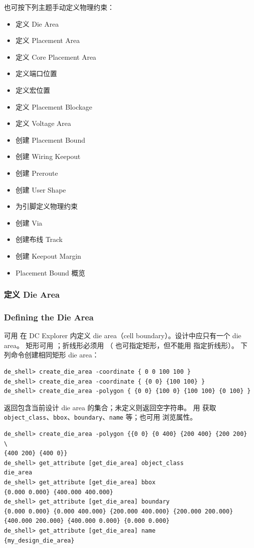 也可按下列主题手动定义物理约束：
\begin{itemize}
  \item 定义 Die Area
  \item 定义 Placement Area
  \item 定义 Core Placement Area
  \item 定义端口位置
  \item 定义宏位置
  \item 定义 Placement Blockage
  \item 定义 Voltage Area
  \item 创建 Placement Bound
  \item 创建 Wiring Keepout
  \item 创建 Preroute
  \item 创建 User Shape
  \item 为引脚定义物理约束
  \item 创建 Via
  \item 创建布线 Track
  \item 创建 Keepout Margin
  \item Placement Bound 概览
\end{itemize}

\subsubsection{定义 Die Area}
\subsubsection*{Defining the Die Area}

可用  在 DC Explorer 内定义 die area（cell boundary）。设计中应只有一个 die area。
矩形可用 ；折线形必须用 （ 也可指定矩形，但不能用  指定折线形）。
下列命令创建相同矩形 die area：
\begin{lstlisting}
de_shell> create_die_area -coordinate { 0 0 100 100 }
de_shell> create_die_area -coordinate { {0 0} {100 100} }
de_shell> create_die_area -polygon { {0 0} {100 0} {100 100} {0 100} }
\end{lstlisting}

 返回包含当前设计 die area 的集合；未定义则返回空字符串。
用  获取 \texttt{object\_class}、\texttt{bbox}、\texttt{boundary}、\texttt{name} 等；也可用  浏览属性。

\begin{lstlisting}
de_shell> create_die_area -polygon {{0 0} {0 400} {200 400} {200 200} \
{400 200} {400 0}}
de_shell> get_attribute [get_die_area] object_class
die_area
de_shell> get_attribute [get_die_area] bbox
{0.000 0.000} {400.000 400.000}
de_shell> get_attribute [get_die_area] boundary
{0.000 0.000} {0.000 400.000} {200.000 400.000} {200.000 200.000}
{400.000 200.000} {400.000 0.000} {0.000 0.000}
de_shell> get_attribute [get_die_area] name
{my_design_die_area}
\end{lstlisting}

